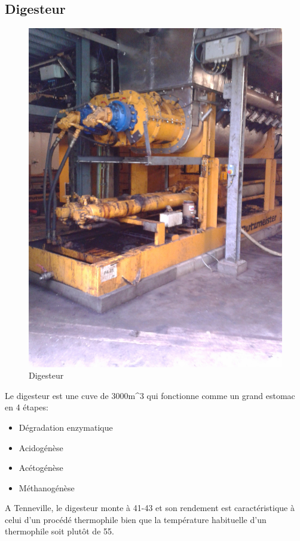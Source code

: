 \documentclass{article}
\begin{document}
\subsection{Digesteur}
\begin{figure}
  \centering
  \includegraphics[scale=0.07]{IMG_20141105_112953.jpg}
  \caption{Digesteur}
  \label{fig:digesteur}
\end{figure}
Le digesteur est une cuve de \unit{3000}{m^3} qui fonctionne comme un grand estomac en 4 étapes: 
\begin{itemize}
\item Dégradation enzymatique
\item Acidogénèse
\item Acétogénèse
\item Méthanogénèse
\end{itemize}
A Tenneville, le digesteur monte à \unit{41}{\celsius}-\unit{43}{\celsius}  et son rendement est caractéristique à celui d'un procédé thermophile bien que la température habituelle d'un thermophile soit plutôt de \unit{55}{\celsius}. 
\end{document}
